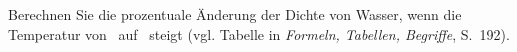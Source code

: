 Berechnen Sie die prozentuale Änderung der Dichte von Wasser, wenn die Temperatur von \tWvO\ auf \tWzO\ steigt (vgl. Tabelle in \emph{Formeln, Tabellen, Begriffe}, S.~192).

